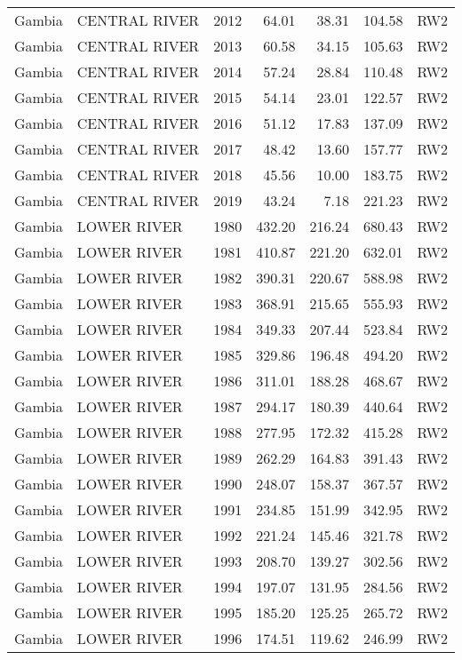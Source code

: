 \begin{longtable}{lllrrrl}
  Gambia & CENTRAL RIVER & 2012 & 64.01 & 38.31 & 104.58 & RW2 \\ 
  Gambia & CENTRAL RIVER & 2013 & 60.58 & 34.15 & 105.63 & RW2 \\ 
  Gambia & CENTRAL RIVER & 2014 & 57.24 & 28.84 & 110.48 & RW2 \\ 
  Gambia & CENTRAL RIVER & 2015 & 54.14 & 23.01 & 122.57 & RW2 \\ 
  Gambia & CENTRAL RIVER & 2016 & 51.12 & 17.83 & 137.09 & RW2 \\ 
  Gambia & CENTRAL RIVER & 2017 & 48.42 & 13.60 & 157.77 & RW2 \\ 
  Gambia & CENTRAL RIVER & 2018 & 45.56 & 10.00 & 183.75 & RW2 \\ 
  Gambia & CENTRAL RIVER & 2019 & 43.24 & 7.18 & 221.23 & RW2 \\ 
  Gambia & LOWER RIVER & 1980 & 432.20 & 216.24 & 680.43 & RW2 \\ 
  Gambia & LOWER RIVER & 1981 & 410.87 & 221.20 & 632.01 & RW2 \\ 
  Gambia & LOWER RIVER & 1982 & 390.31 & 220.67 & 588.98 & RW2 \\ 
  Gambia & LOWER RIVER & 1983 & 368.91 & 215.65 & 555.93 & RW2 \\ 
  Gambia & LOWER RIVER & 1984 & 349.33 & 207.44 & 523.84 & RW2 \\ 
  Gambia & LOWER RIVER & 1985 & 329.86 & 196.48 & 494.20 & RW2 \\ 
  Gambia & LOWER RIVER & 1986 & 311.01 & 188.28 & 468.67 & RW2 \\ 
  Gambia & LOWER RIVER & 1987 & 294.17 & 180.39 & 440.64 & RW2 \\ 
  Gambia & LOWER RIVER & 1988 & 277.95 & 172.32 & 415.28 & RW2 \\ 
  Gambia & LOWER RIVER & 1989 & 262.29 & 164.83 & 391.43 & RW2 \\ 
  Gambia & LOWER RIVER & 1990 & 248.07 & 158.37 & 367.57 & RW2 \\ 
  Gambia & LOWER RIVER & 1991 & 234.85 & 151.99 & 342.95 & RW2 \\ 
  Gambia & LOWER RIVER & 1992 & 221.24 & 145.46 & 321.78 & RW2 \\ 
  Gambia & LOWER RIVER & 1993 & 208.70 & 139.27 & 302.56 & RW2 \\ 
  Gambia & LOWER RIVER & 1994 & 197.07 & 131.95 & 284.56 & RW2 \\ 
  Gambia & LOWER RIVER & 1995 & 185.20 & 125.25 & 265.72 & RW2 \\ 
  Gambia & LOWER RIVER & 1996 & 174.51 & 119.62 & 246.99 & RW2 \\ 

\end{longtable}

